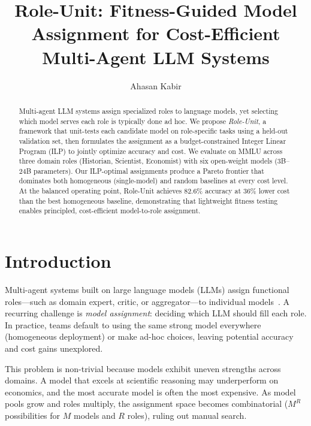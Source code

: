 \documentclass[sigconf,nonacm]{acmart}
\begin{document}
\title{Role-Unit: Fitness-Guided Model Assignment for Cost-Efficient Multi-Agent LLM Systems}

\author{Ahasan Kabir}

\begin{abstract}
Multi-agent LLM systems assign specialized roles to language models, yet selecting which model serves each role is typically done ad hoc. We propose \textit{Role-Unit}, a framework that unit-tests each candidate model on role-specific tasks using a held-out validation set, then formulates the assignment as a budget-constrained Integer Linear Program (ILP) to jointly optimize accuracy and cost. We evaluate on MMLU across three domain roles (Historian, Scientist, Economist) with six open-weight models (3B--24B parameters). Our ILP-optimal assignments produce a Pareto frontier that dominates both homogeneous (single-model) and random baselines at every cost level. At the balanced operating point, Role-Unit achieves 82.6\% accuracy at 36\% lower cost than the best homogeneous baseline, demonstrating that lightweight fitness testing enables principled, cost-efficient model-to-role assignment.
\end{abstract}

\maketitle

\section{Introduction}

Multi-agent systems built on large language models (LLMs) assign functional roles---such as domain expert, critic, or aggregator---to individual models~\cite{guo2024large, qian2024chatdev}. A recurring challenge is \textit{model assignment}: deciding which LLM should fill each role. In practice, teams default to using the same strong model everywhere (homogeneous deployment) or make ad-hoc choices, leaving potential accuracy and cost gains unexplored.

This problem is non-trivial because models exhibit uneven strengths across domains. A model that excels at scientific reasoning may underperform on economics, and the most accurate model is often the most expensive. As model pools grow and roles multiply, the assignment space becomes combinatorial ($M^R$ possibilities for $M$ models and $R$ roles), ruling out manual search.
\end{document}
